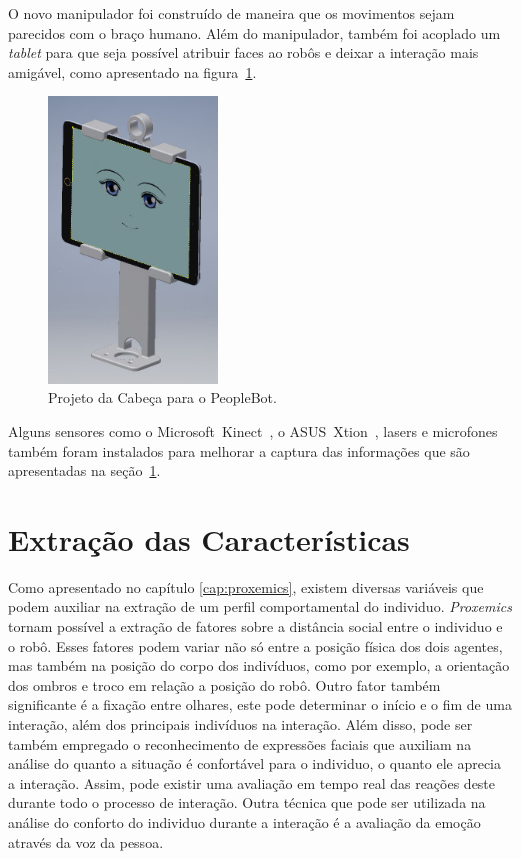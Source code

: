 O novo manipulador foi construído de maneira que os movimentos sejam parecidos com o braço humano. Além do manipulador, também foi acoplado um \emph{tablet} para que seja possível atribuir faces ao robôs e deixar a interação mais amigável, como apresentado na figura~\ref{fig:judithhead}.

\begin{figure}[ht!]
	\centering
	\includegraphics[width=0.4\textwidth]{images/judith_head.jpg}
	\caption{Projeto da Cabeça para o PeopleBot.}
	\label{fig:judithhead}
\end{figure}

Alguns sensores como o Microsoft\textregistered\ Kinect\textregistered\ , o ASUS\textregistered\ Xtion\textregistered\ , lasers e microfones também foram instalados para melhorar a captura das informações que são apresentadas na seção~\ref{sec:extracaocaracteristicas}.

\section{Extração das Características}
\label{sec:extracaocaracteristicas}

Como apresentado no capítulo \ref{cap:proxemics}, existem diversas variáveis que podem auxiliar na extração de um perfil comportamental do individuo. \emph{Proxemics} tornam possível a extração de fatores sobre a distância social entre o individuo e o robô. Esses fatores podem variar não só entre a posição física dos dois agentes, mas também na posição do corpo dos indivíduos, como por exemplo, a orientação dos ombros e troco em relação a posição do robô. Outro fator também significante é a fixação entre olhares, este pode determinar o início e o fim de uma interação, além dos principais indivíduos na interação. Além disso, pode ser também empregado o reconhecimento de expressões faciais que auxiliam na análise do quanto a situação é confortável para o individuo, o quanto ele aprecia a interação. Assim, pode existir uma avaliação em tempo real das reações deste durante todo o processo de interação. Outra técnica que pode ser utilizada na análise do conforto do individuo durante a interação é a avaliação da emoção através da voz da pessoa.

